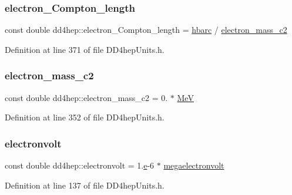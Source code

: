 \subsubsection{\texorpdfstring{electron\+\_\+\+Compton\+\_\+length}{electron\_Compton\_length}}
{\footnotesize\ttfamily const double dd4hep\+::electron\+\_\+\+Compton\+\_\+length = \hyperlink{namespacedd4hep_aee6340c5f86bb7ae1edcc2a90efa056e}{hbarc} / \hyperlink{namespacedd4hep_a90fb8853ce4da9b13bd108593b2d154d}{electron\+\_\+mass\+\_\+c2}\hspace{0.3cm}{\ttfamily [static]}}



Definition at line 371 of file D\+D4hep\+Units.\+h.

\hypertarget{namespacedd4hep_a90fb8853ce4da9b13bd108593b2d154d}{}\label{namespacedd4hep_a90fb8853ce4da9b13bd108593b2d154d} 
\subsubsection{\texorpdfstring{electron\+\_\+mass\+\_\+c2}{electron\_mass\_c2}}
{\footnotesize\ttfamily const double dd4hep\+::electron\+\_\+mass\+\_\+c2 = 0. $\ast$ \hyperlink{namespacedd4hep_a6dee62809c6ee54d2fc90671f4dc8b91}{MeV}\hspace{0.3cm}{\ttfamily [static]}}



Definition at line 352 of file D\+D4hep\+Units.\+h.

\hypertarget{namespacedd4hep_a849fe8dd27af5a22a8d7891687a4d499}{}\label{namespacedd4hep_a849fe8dd27af5a22a8d7891687a4d499} 
\subsubsection{\texorpdfstring{electronvolt}{electronvolt}}
{\footnotesize\ttfamily const double dd4hep\+::electronvolt = 1.\hyperlink{_volumes_8cpp_a8a9a1f93e9b09afccaec215310e64142}{e}-\/6 $\ast$ \hyperlink{namespacedd4hep_a4e39beba039f7a6bda24a7031c121b2a}{megaelectronvolt}\hspace{0.3cm}{\ttfamily [static]}}



Definition at line 137 of file D\+D4hep\+Units.\+h.

